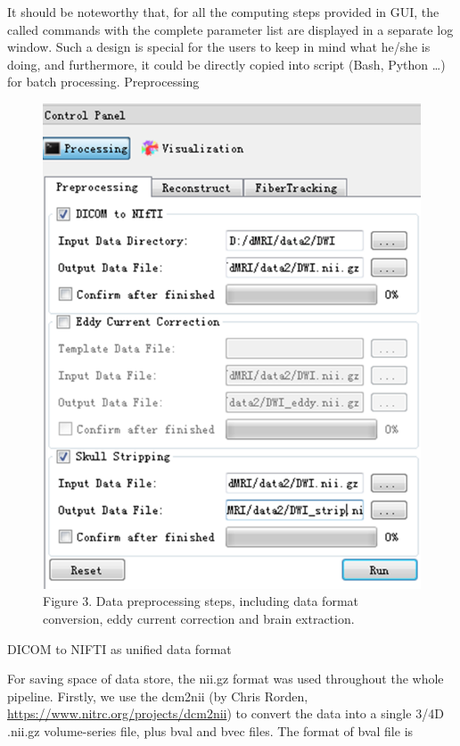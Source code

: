 \documentclass[letterpaper,10pt,english]{sphinxmanual}
\begin{document}
It should be noteworthy that, for all the computing steps provided in GUI, the called commands with the complete parameter list are displayed in a separate log window. Such a design is special for the users to keep in mind what he/she is doing, and furthermore, it could be directly copied into script (Bash, Python …) for batch processing.
Preprocessing
\begin{figure}[htbp]
\centering
\capstart

\includegraphics{preprocessing.png}
\caption{Figure 3. Data preprocessing steps, including data format conversion, eddy current correction and brain extraction.}\end{figure}

DICOM to NIFTI as unified data format

For saving space of data store, the nii.gz format was used throughout the whole pipeline. Firstly, we use the dcm2nii (by Chris Rorden, \href{https://www.nitrc.org/projects/dcm2nii}{https://www.nitrc.org/projects/dcm2nii}) to convert the data into a single 3/4D .nii.gz volume-series file, plus bval and bvec files. The format of bval file is
\end{document}
